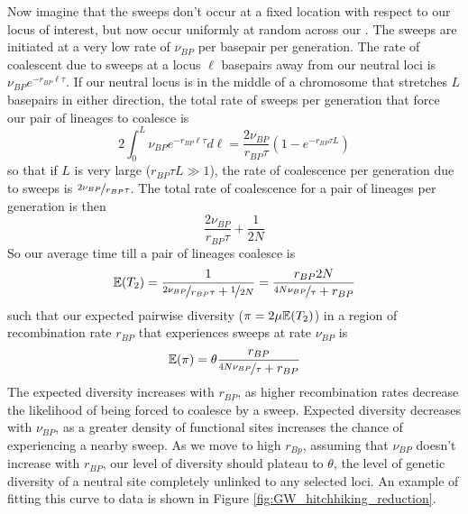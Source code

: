 Now imagine that the sweeps don't occur at a fixed location with
respect to our locus of interest, but now occur uniformly at random
across our . The sweeps are initiated at a very low rate of
$\nu_{BP}$ per basepair per generation. The rate of coalescent due to
sweeps at a locus $\ell$ basepairs away from our neutral loci is
$\nu_{BP} e^{-r_{BP} \ell \tau}$. If our neutral locus is in the
middle of a chromosome that stretches $L$ basepairs in either direction,
the total rate of sweeps per generation that force our pair of lineages to coalesce is
\begin{equation}
2\int_0^{L} \nu_{BP} e^{-r_{BP} \ell \tau} d \ell =
\frac{2\nu_{BP}}{r_{BP} \tau} \left(1-e^{-r_{BP} \tau L} \right)
\end{equation}
so that if $L$ is very large ($r_{BP} \tau L \gg 1$), the rate of coalescence per
generation due to sweeps is $\nicefrac{2\nu_{BP}}{r_{BP} \tau}$. The total rate
of coalescence for a pair of lineages per generation is then
\begin{equation}
\frac{2\nu_{BP}}{r_{BP} \tau}+\frac{1}{2N}
\end{equation}
So our average time till a pair of lineages coalesce is
\begin{equation}
\mathbb{E}(T_2) = \frac{1}{\nicefrac{2\nu_{BP}}{r_{BP} \tau}+\nicefrac{1}{2N}} = \frac{r_{BP}2N}{\nicefrac{4N\nu_{BP}}{ \tau}+r_{BP}}
\end{equation}
such that our expected pairwise diversity ($\pi=2\mu\mathbb{E}(T_2)$) in a region of
recombination rate $r_{BP}$ that experiences sweeps at rate $\nu_{BP}$
is  
\begin{equation}
\mathbb{E}(\pi) = \theta \frac{r_{BP}}{\nicefrac{4N\nu_{BP}}{ \tau}+r_{BP}} \label{eqn:pi_GW_HH}
\end{equation}
The expected diversity increases with $r_{BP}$, as higher recombination rates decrease the likelihood of being forced to coalesce by a sweep. Expected diversity decreases with $\nu_{BP}$, as a greater density of functional sites increases the chance of experiencing a nearby sweep. As we move to high $r_{Bp}$, assuming that $\nu_{BP}$ doesn't increase with $r_{BP}$, our level of diversity should plateau to $\theta$, the level of genetic diversity of a neutral site completely unlinked to any selected loci. An example of fitting this curve to data is shown in Figure \ref{fig:GW_hitchhiking_reduction}. 

